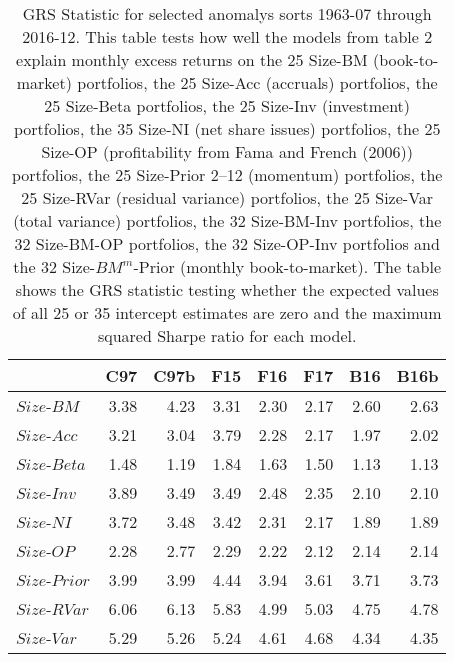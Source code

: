 
\begin{table}[!ht]
\centering
\caption{
\scriptsize{
GRS Statistic for selected anomalys sorts 1963-07 through 2016-12. This table tests how
well the models from table 2 explain monthly excess returns on the 25 Size-BM (book-to-
market) portfolios, the 25 Size-Acc (accruals) portfolios, the 25 Size-Beta portfolios,
the 25 Size-Inv (investment) portfolios, the 35 Size-NI (net share issues) portfolios, the
25 Size-OP (profitability from Fama and French (2006)) portfolios, the 25 Size-Prior 2–12
(momentum) portfolios, the 25 Size-RVar (residual variance) portfolios, the 25 Size-Var
(total variance) portfolios, the 32 Size-BM-Inv portfolios, the 32 Size-BM-OP portfolios,
the 32 Size-OP-Inv portfolios and the 32 Size-$BM^m$-Prior (monthly book-to-market). The
table shows the GRS statistic testing whether the expected values of all 25 or 35
intercept estimates are zero and the maximum squared Sharpe ratio for each model.
}
}
\begin{tabular}{lrrrrrrr}
  \toprule
     & C97  & C97b  & F15  & F16  & F17  & B16  & B16b  \\
  \midrule
  
    $Size$-$BM$  & 3.38  & 4.23  & 3.31  & 2.30  & 2.17  & 2.60  & 2.63  \\
  
    $Size$-$Acc$  & 3.21  & 3.04  & 3.79  & 2.28  & 2.17  & 1.97  & 2.02  \\
  
    $Size$-$Beta$  & 1.48  & 1.19  & 1.84  & 1.63  & 1.50  & 1.13  & 1.13  \\
  
    $Size$-$Inv$  & 3.89  & 3.49  & 3.49  & 2.48  & 2.35  & 2.10  & 2.10  \\
  
    $Size$-$NI$  & 3.72  & 3.48  & 3.42  & 2.31  & 2.17  & 1.89  & 1.89  \\
  
    $Size$-$OP$  & 2.28  & 2.77  & 2.29  & 2.22  & 2.12  & 2.14  & 2.14  \\
  
    $Size$-$Prior$  & 3.99  & 3.99  & 4.44  & 3.94  & 3.61  & 3.71  & 3.73  \\
  
    $Size$-$RVar$  & 6.06  & 6.13  & 5.83  & 4.99  & 5.03  & 4.75  & 4.78  \\
  
    $Size$-$Var$  & 5.29  & 5.26  & 5.24  & 4.61  & 4.68  & 4.34  & 4.35  \\
  

\end{tabular}
\end{table}
